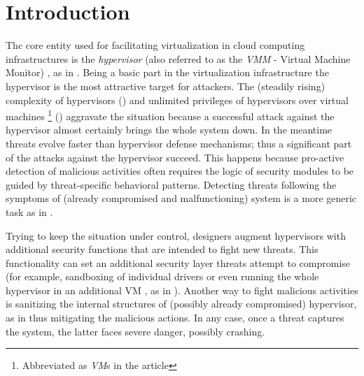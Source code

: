 
\section{Introduction}

Thc core entity used for facilitating virtualization in cloud computing
infrastructures is the \textit{hypervisor} (also referred to as the
\textit{VMM} - Virtual Machine Monitor) , as in \cite{Azab:2010:HES:1866307.1866313,Ben-Yehuda:nested-HV:2010,coker-sandboxing,Colp:HV-modularization:2011,DBLP:conf:raid:Stewin13,ddos-cpuid,defense-rootkit-attacks,GMU-CS-TR-Evasion-2011-8,hypervisor-security-future,liu-mao:distributed-HV:2013,McCune:2008:FEI:1357010.1352625,Pearce:2013:VIS:2431211.2431216}.
Being a basic part in the virtualization infrastructure the hypervisor
is the most attractive target for attackers. The (steadily rising)
complexity of hypervisors (\cite{Colp:HV-modularization:2011}) and
unlimited privileges of hypervisors over virtual machines%
\footnote{Abbreviated as \textit{VM}s in the article%
} (\cite{pfoh-vmmonitor-2013,Wailly:2012:VMS:2371536.2371564}) aggravate
the situation because a successful attack against the hypervisor almost
certainly brings the whole system down. In the meantime threats evolve
faster than hypervisor defense mechanisms; thus a significant part
of the attacks against the hypervisor succeed. This happens because
pro-active detection of malicious activities often requires the logic
of security modules to be guided by threat-specific behavioral patterns.
Detecting threats following the symptoms of (already compromised and
malfunctioning) system is a more generic task as in \cite{Wang:rootkits:2009}.

Trying to keep the situation under control, designers augment hypervisors
with additional security functions that are intended to fight new
threats. This functionality can set an additional security layer threats
attempt to compromise (for example, sandboxing of individual drivers
\cite{coker-sandboxing} or even running the whole hypervisor in an
additional VM , as in \cite{Ben-Yehuda:nested-HV:2010}). Another
way to fight malicious activities is sanitizing the internal structures
of (possibly already compromised) hypervisor, as in \cite{Wailly:2012:VMS:2371536.2371564}
thus mitigating the malicious actions. In any case, once a threat
captures the system, the latter faces severe danger, possibly crashing.

